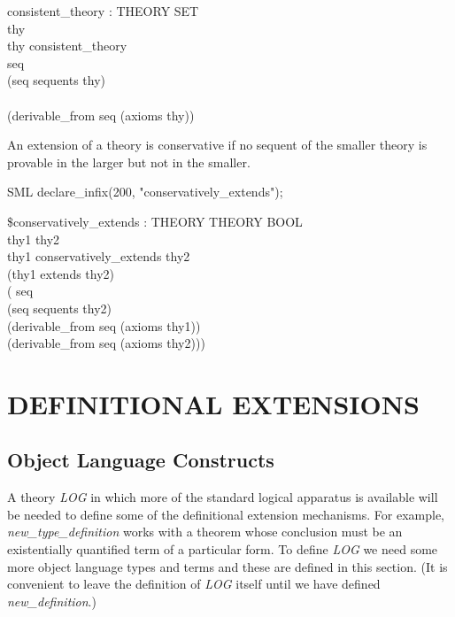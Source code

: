 \documentclass[a4paper,11pt,titlepage]{article}
\begin{document}
\begin{titlepage}
\begin{HOLConst}
\+	\PrNL{}consistent\_theory\PrNN{} : THEORY SET\\
\PrPH{}
\+	\MMM{\forall} thy \MMM{\bullet}\\
\+	thy \MMM{\in} consistent\_theory  \MMM{\Leftrightarrow}\\
\+	\MMM{\exists} seq \MMM{\bullet}\\
\+	(seq \MMM{\in} sequents thy)\\
\+	\MMM{\land}\\
\+	\MMM{\lnot}(derivable\_from seq (axioms thy))\\
\end{HOLConst}

An extension of a theory is conservative if no sequent
of the smaller theory is provable in the larger but not
in the smaller.
\begin{GFT}{SML}
\+declare\_infix(200, "conservatively\_extends");\\
\end{GFT}
\begin{HOLConst}
\+	\$\PrNL{}conservatively\_extends\PrNN{} : THEORY \MMM{\rightarrow} THEORY \MMM{\rightarrow} BOOL\\
\PrPH{}
\+	\MMM{\forall} thy1 thy2\MMM{\bullet}\\
\+	thy1 conservatively\_extends thy2 \MMM{\Leftrightarrow}\\
\+	(thy1 extends thy2) \MMM{\land}\\
\+	(\MMM{\forall} seq \MMM{\bullet}\\
\+	(seq \MMM{\in} sequents thy2) \MMM{\Rightarrow}\\
\+	(derivable\_from seq (axioms thy1)) \MMM{\Rightarrow}\\
\+	(derivable\_from seq (axioms thy2)))\\
\end{HOLConst}


\section{DEFINITIONAL EXTENSIONS} \label{DEFINITIONS}

\subsection{Object Language Constructs}

A theory {\it LOG}
in which more of the standard logical apparatus is
available will be needed to define some of the definitional
extension mechanisms.
For example, {\it new\_type\_definition}
works with a theorem whose conclusion must be an
existentially quantified term of a particular form.
To define {\it LOG} we need some more object language
types and terms and these are defined in this section.
(It is convenient to leave the definition of {\it LOG}
itself until we have defined {\it new\_definition}.)


\end{titlepage}
\end{document}

